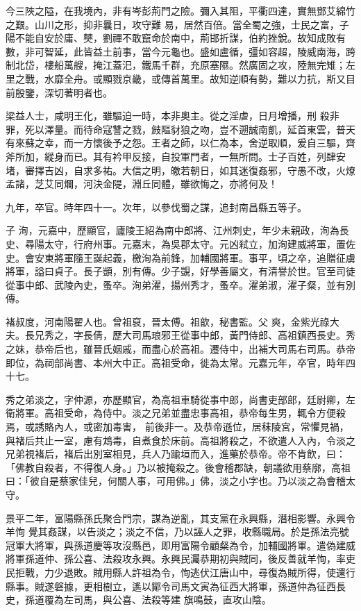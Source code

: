 \begin{pinyinscope}
 今三陜之隘，在我境內，非有岑彭荊門之險。彌入其阻，平衢四達，實無鄧艾綿竹之艱。山川之形，抑非曩日，攻守難
 易，居然百倍。當全蜀之強，士民之富，子陽不能自安於庸、僰，劉禪不敢竄命於南中，荊邯折謀，伯約挫銳。故知成敗有數，非可智延，此皆益土前事，當今元龜也。盛如盧循，彊如容超，陵威南海，跨制北岱，樓船萬艘，掩江蓋汜，鐵馬千群，充原塞隰。然廣固之攻，陸無完雉；左里之戰，水靡全舟。或顯戮京畿，或傳首萬里。故知逆順有勢，難以力抗，斯又目前殷鑒，深切著明者也。



 梁益人士，咸明王化，雖驅迫一時，本非奧主。從之淫虐，日月增播，刑
 殺非罪，死以澤量。而待命寇讐之戮，㩻䧢豺狼之吻，豈不遡誠南凱，延首東雲，普天有來蘇之幸，而一方懷後予之怨。王者之師，以仁為本，舍逆取順，爰自三驅，齊斧所加，縱身而已。其有衿甲反接，自投軍門者，一無所問。士子百姓，列肆安堵，審擇吉凶，自求多祐。大信之明，皦若朝日，如其迷復姦邪，守愚不改，火燎孟諸，芝艾同爛，河決金隄，淵丘同體，雖欲悔之，亦將何及！



 九年，卒官。時年四十一。次年，以參伐蜀之謀，追封南昌縣五等子。



 子
 洵，元嘉中，歷顯官，廬陵王紹為南中郎將、江州刺史，年少未親政，洵為長史、尋陽太守，行府州事。元嘉末，為吳郡太守。元凶弒立，加洵建威將軍，置佐史。會安東將軍隨王誕起義，檄洵為前鋒，加輔國將軍。事平，頃之卒，追贈征虜將軍，謚曰貞子。長子顗，別有傳。少子覬，好學善屬文，有清譽於世。官至司徒從事中郎、武陵內史，蚤卒。洵弟濯，揚州秀才，蚤卒。濯弟淑，濯子粲，並有別傳。



 褚叔度，河南陽翟人也。曾祖裒，晉太傅。祖歆，秘書監。父
 爽，金紫光祿大夫。長兄秀之，字長倩，歷大司馬琅邪王從事中郎，黃門侍郎、高祖鎮西長史。秀之妹，恭帝后也，雖晉氏姻戚，而盡心於高祖。遷侍中，出補大司馬右司馬。恭帝即位，為祠部尚書、本州大中正。高祖受命，徙為太常。元嘉元年，卒官，時年四十七。



 秀之弟淡之，字仲源，亦歷顯官，為高祖車騎從事中郎，尚書吏部郎，廷尉卿，左衛將軍。高祖受命，為侍中。淡之兄弟並盡忠事高祖，恭帝每生男，輒令方便殺焉，或誘賂內人，或密加毒害，
 前後非一。及恭帝遜位，居秣陵宮，常懼見禍，與褚后共止一室，慮有鴆毒，自煮食於床前。高祖將殺之，不欲遣人入內，令淡之兄弟視褚后，褚后出別室相見，兵人乃踰垣而入，進藥於恭帝。帝不肯飲，曰：「佛教自殺者，不得復人身。」乃以被掩殺之。後會稽郡缺，朝議欲用蔡廓，高祖曰：「彼自是蔡家佳兒，何關人事，可用佛。」佛，淡之小字也。乃以淡之為會稽太守。



 景平二年，富陽縣孫氏聚合門宗，謀為逆亂，其支黨在永興縣，潛相影響。永興令羊恂
 覺其姦謀，以告淡之；淡之不信，乃以誣人之罪，收縣職局。於是孫法亮號冠軍大將軍，與孫道慶等攻沒縣邑，即用富陽令顧粲為令，加輔國將軍。遣偽建威將軍孫道仲、孫公喜、法殺攻永興。永興民灟恭期初與賊同，後反善就羊恂，率吏民拒戰，力少退敗。賊用縣人許祖為令，恂逃伏江唐山中，尋復為賊所得，使還行縣事。賊遂磐據，更相樹立，遙以鄮令司馬文寅為征西大將軍，孫道仲為征西長史，孫道覆為左司馬，與公喜、法殺等建
 旗鳴鼓，直攻山陰。




\end{pinyinscope}
